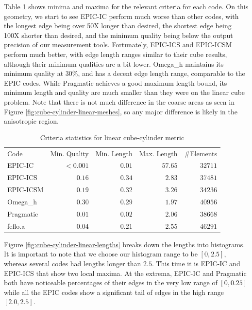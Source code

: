 \documentclass[3p,times,procedia,number]{elsarticle}
\begin{document}
Table \ref{tab:cube-cylinder-linear-stats} shows minima
and maxima for the relevant criteria for each code.
On this geometry, we start to see EPIC-IC perform much
worse than other codes, with the longest edge being over
50X longer than desired, the shortest edge being
100X shorter than desired, and the minimum quality being
below the output precision of our measurement tools.
Fortunately, EPIC-ICS and EPIC-ICSM perform much better,
with edge length ranges similar to their cube results,
although their minimum qualities are a bit lower.
Omega\_h maintains its minimum quality at 30\%, and
has a decent edge length range, comparable to the EPIC codes.
While Pragmatic achieves a good maximum length bound,
its minimum length and quality are much smaller than they
were on the linear cube problem.
Note that there is not much difference in the coarse areas
as seen in Figure \ref{fig:cube-cylinder-linear-meshes},
so any major difference is likely in the anisotropic region.

\begin{table}
\caption{Criteria statistics for linear cube-cylinder metric}
\label{tab:cube-cylinder-linear-stats}
\begin{tabular}{lrrrr}
Code & Min. Quality & Min. Length & Max. Length & \#Elements\\
EPIC-IC    &$<0.001$&       $0.01$&      $57.65$&    $32711$\\
EPIC-ICS   &  $0.16$&       $0.34$&      $ 2.83$&    $37481$\\
EPIC-ICSM  &  $0.19$&       $0.32$&      $ 3.26$&    $34236$\\
Omega\_h   &  $0.30$&       $0.29$&      $ 1.97$&    $40956$\\
Pragmatic  &  $0.01$&       $0.02$&      $ 2.06$&    $38668$\\
feflo.a    &  $0.04$&       $0.21$&      $ 2.55$&    $46291$\\
\end{tabular}
\end{table}

Figure \ref{fig:cube-cylinder-linear-lengths} breaks down the
lengths into histograms.
It is important to note that we choose our histogram range to
be $[0,2.5]$, whereas several codes had lengths longer than $2.5$.
This time it is EPIC-IC and EPIC-ICS that show two local maxima.
At the extrema, EPIC-IC and Pragmatic both have noticeable
percentages of their edges in the very low range of $[0,0.25]$
while all the EPIC codes show a significant tail of edges
in the high range $[2.0,2.5]$.
\end{document}
